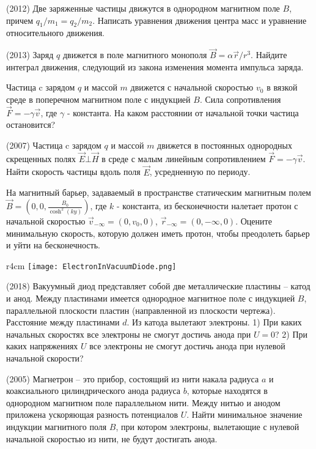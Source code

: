 \AddProb (2012) Две заряженные частицы движутся в однородном магнитном поле $B$, причем $q_1/m_1 = q_2/m_2$. Написать уравнения движения центра масс и уравнение относительного движения.

\AddProb (2013) Заряд $q$ движется в поле магнитного монополя $\vec{B} = \alpha \vec{r}/r^3$. Найдите интеграл движения, следующий из закона изменения момента импульса заряда.

\AddProb Частица c зарядом $q$ и массой $m$ движется с начальной скоростью $v_0$ в вязкой среде в поперечном магнитном поле с индукцией $B$. Сила сопротивления $\vec{F} = -\gamma \vec{v}$, где $\gamma$ - константа. На каком расстоянии от начальной точки частица остановится?

\AddProb (2007) Частица c зарядом $q$ и массой $m$ движется в постоянных однородных скрещенных полях $\vec{E} \bot \vec{H}$ в среде с малым линейным сопротивлением $\vec{F} = -\gamma \vec{v}$. Найти скорость частицы вдоль поля $\vec{E}$, усредненную по периоду.

\AddProb На магнитный барьер, задаваемый в пространстве статическим магнитным полем $\vec{B} = \left(0, 0, \frac{B_0}{\cosh^2(ky)}\right)$, где $k$ - константа, из бесконечности налетает протон с начальной скоростью $\vec{v}_{-\infty} = (0, v_0, 0)$, $\vec{r}_{-\infty} = (0, -\infty, 0)$. Оцените минимальную скорость, которую должен иметь протон, чтобы преодолеть барьер и уйти на бесконечность. 

\begin{wrapfigure}{r}{4cm}
\texttt{[image: ElectronInVacuumDiode.png]}
\end{wrapfigure}
\AddProb (2018) Вакуумный диод представляет собой две металлические пластины -- катод и анод. Между пластинами имеется однородное магнитное поле с индукцией $B$, параллельной плоскости пластин (направленной из плоскости чертежа). Расстояние между пластинами $d$. Из катода вылетают электроны. 1) При каких начальных скоростях все электроны не смогут достичь анода при $U = 0$? 2) При каких напряжениях $U$ все электроны не смогут достичь анода при нулевой начальной скорости?

\AddProb (2005)  Магнетрон -- это прибор, состоящий из нити накала радиуса $a$ и коаксиального цилиндрического анода радиуса $b$, которые находятся в однородном магнитном поле параллельном нити. Между нитью и анодом приложена ускоряющая разность потенциалов $U$. Найти минимальное значение индукции магнитного поля $B$, при котором электроны, вылетающие с нулевой начальной скоростью из нити, не будут достигать анода.

